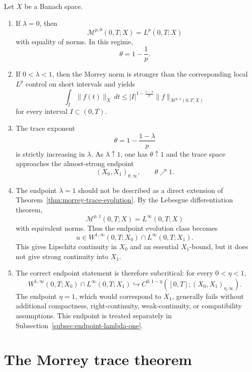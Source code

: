\documentclass[smallextended,envcountsect,envcountsame]{svjour3}
\begin{document}
	
	\begin{remark}\label{rem:lambda-limits}
		Let $X$ be a Banach space.
		
		\begin{enumerate}[label=\textup{(\roman*)}]
			\item If $\lambda=0$, then
			\[
			\mathcal M^{p,0}(0,T;X)=L^p(0,T;X)
			\]
			with equality of norms. In this regime,
			\[
			\theta=1-\frac1p.
			\]
			
			\item If $0<\lambda<1$, then the Morrey norm is stronger than the corresponding local $L^p$ control on short intervals and yields
			\[
			\int_I \|f(t)\|_{X}\,dt
			\le
			|I|^{1-\frac{1-\lambda}{p}}
			\|f\|_{\mathcal M^{p,\lambda}(0,T;X)}
			\]
			for every interval $I\subset(0,T)$.
			
			\item The trace exponent
			\[
			\theta=1-\frac{1-\lambda}{p}
			\]
			is strictly increasing in $\lambda$. As $\lambda\uparrow1$, one has $\theta\uparrow1$ and the trace space approaches the almost-strong endpoint
			\[
			(X_0,X_1)_{\theta,\infty},
			\qquad \theta\nearrow1.
			\]
			
			\item The endpoint $\lambda=1$ should not be described as a direct extension of Theorem~\ref{thm:morrey-trace-evolution}. By the Lebesgue differentiation theorem,
			\[
			\mathcal M^{p,1}(0,T;X)=L^\infty(0,T;X)
			\]
			with equivalent norms. Thus the endpoint evolution class becomes
			\[
			u\in W^{1,\infty}(0,T;X_0)\cap L^\infty(0,T;X_1).
			\]
			This gives Lipschitz continuity in $X_0$ and an essential $X_1$-bound, but it does not give strong continuity into $X_1$.
			
			\item The correct endpoint statement is therefore subcritical: for every $0<\eta<1$,
			\[
			W^{1,\infty}(0,T;X_0)\cap L^\infty(0,T;X_1)
			\hookrightarrow
			C^{0,1-\eta}([0,T];(X_0,X_1)_{\eta,\infty}).
			\]
			The endpoint $\eta=1$, which would correspond to $X_1$, generally fails without additional compactness, right-continuity, weak-continuity, or compatibility assumptions. This endpoint is treated separately in Subsection~\ref{subsec:endpoint-lambda-one}.
		\end{enumerate}
	\end{remark}

	


	\section{The Morrey trace theorem}\label{sec:trace}
	
\end{document}

